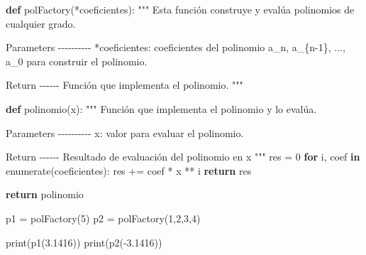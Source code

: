 \documentclass[
  spanish,
  letterpaper,
]{scrbook}
\newenvironment{Shaded}{\begin{snugshade}}{\end{snugshade}}
\newcommand{\BuiltInTok}[1]{\textcolor[rgb]{0.00,0.23,0.31}{#1}}
\newcommand{\CommentTok}[1]{\textcolor[rgb]{0.37,0.37,0.37}{#1}}
\newcommand{\ControlFlowTok}[1]{\textcolor[rgb]{0.00,0.23,0.31}{\textbf{#1}}}
\newcommand{\DecValTok}[1]{\textcolor[rgb]{0.68,0.00,0.00}{#1}}
\newcommand{\FloatTok}[1]{\textcolor[rgb]{0.68,0.00,0.00}{#1}}
\newcommand{\KeywordTok}[1]{\textcolor[rgb]{0.00,0.23,0.31}{\textbf{#1}}}
\newcommand{\NormalTok}[1]{\textcolor[rgb]{0.00,0.23,0.31}{#1}}
\newcommand{\OperatorTok}[1]{\textcolor[rgb]{0.37,0.37,0.37}{#1}}
\theoremstyle{definition}
\theoremstyle{remark}
\begin{document}
\begin{Shaded}
\begin{Highlighting}[]
\KeywordTok{def}\NormalTok{ polFactory(}\OperatorTok{*}\NormalTok{coeficientes):}
    \CommentTok{"""}
\CommentTok{    Esta función construye y evalúa polinomios }
\CommentTok{    de cualquier grado.}

\CommentTok{    Parameters}
\CommentTok{    {-}{-}{-}{-}{-}{-}{-}{-}{-}{-}}
\CommentTok{    *coeficientes: coeficientes del polinomio a\_n, a\_\{n{-}1\}, ..., a\_0}
\CommentTok{    para construir el polinomio.}

\CommentTok{    Return}
\CommentTok{    {-}{-}{-}{-}{-}{-}}
\CommentTok{    Función que implementa el polinomio.}
\CommentTok{    """}
    
    \KeywordTok{def}\NormalTok{ polinomio(x):}
        \CommentTok{"""}
\CommentTok{        Función que implementa el polinomio y lo evalúa.}

\CommentTok{        Parameters}
\CommentTok{        {-}{-}{-}{-}{-}{-}{-}{-}{-}{-}}
\CommentTok{        x: valor para evaluar el polinomio.}

\CommentTok{        Return}
\CommentTok{        {-}{-}{-}{-}{-}{-}}
\CommentTok{        Resultado de evaluación del polinomio en \textquotesingle{}x\textquotesingle{}}
\CommentTok{        """}
\NormalTok{        res }\OperatorTok{=} \DecValTok{0}
        \ControlFlowTok{for}\NormalTok{ i, coef }\KeywordTok{in} \BuiltInTok{enumerate}\NormalTok{(coeficientes):}
\NormalTok{            res }\OperatorTok{+=}\NormalTok{ coef }\OperatorTok{*}\NormalTok{ x }\OperatorTok{**}\NormalTok{ i}
        \ControlFlowTok{return}\NormalTok{ res}
    
    \ControlFlowTok{return}\NormalTok{ polinomio}
\end{Highlighting}
\end{Shaded}

\begin{Shaded}
\begin{Highlighting}[]
\NormalTok{p1 }\OperatorTok{=}\NormalTok{ polFactory(}\DecValTok{5}\NormalTok{)}
\NormalTok{p2 }\OperatorTok{=}\NormalTok{ polFactory(}\DecValTok{1}\NormalTok{,}\DecValTok{2}\NormalTok{,}\DecValTok{3}\NormalTok{,}\DecValTok{4}\NormalTok{)}

\BuiltInTok{print}\NormalTok{(p1(}\FloatTok{3.1416}\NormalTok{))}
\BuiltInTok{print}\NormalTok{(p2(}\OperatorTok{{-}}\FloatTok{3.1416}\NormalTok{))}
\end{Highlighting}
\end{Shaded}
\end{document}
